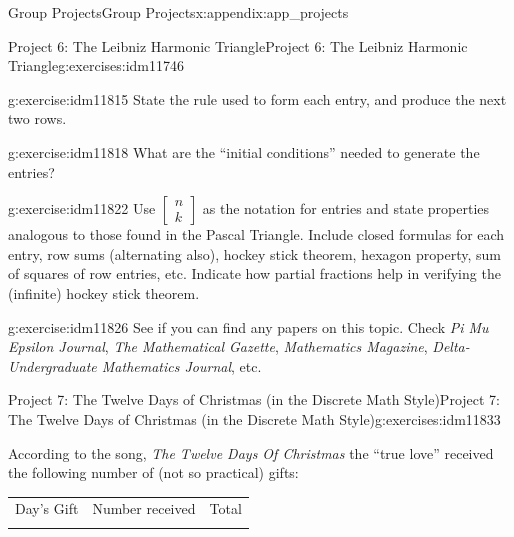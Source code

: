 \documentclass[oneside,10pt,]{book}
\numberwithin{equation}{chapter}
\newcommand{\hrulemedium}{\noalign{\hrule height 0.07em}}
\begin{document}
\begin{appendixptx}{Group Projects}{}{Group Projects}{}{}{x:appendix:app_projects}
\begin{exercises-section-numberless}{Project 6: The Leibniz Harmonic Triangle}{}{Project 6: The Leibniz Harmonic Triangle}{}{}{g:exercises:idm11746}
\begin{sidebyside}{1}{0}{0}{0}
\begin{sbspanel}{1}
{\par}
\end{sbspanel}%
\end{sidebyside}%
\begin{divisionexercise}{1}{}{}{g:exercise:idm11815}%
State the rule used to form each entry, and produce the next two rows.%
\end{divisionexercise}%
\begin{divisionexercise}{2}{}{}{g:exercise:idm11818}%
What are the ``initial conditions'' needed to generate the entries?%
\end{divisionexercise}%
\begin{divisionexercise}{3}{}{}{g:exercise:idm11822}%
Use \(\begin{bmatrix} n\\ k \end{bmatrix}\) as the notation for entries and state properties analogous to those found in the Pascal Triangle. Include closed formulas for each entry, row sums (alternating also), hockey stick theorem, hexagon property, sum of squares of row entries, etc. Indicate how partial fractions help in verifying the (infinite) hockey stick theorem.%
\end{divisionexercise}%
\begin{divisionexercise}{4}{}{}{g:exercise:idm11826}%
See if you can find any papers on this topic. Check \emph{Pi Mu Epsilon Journal}, \emph{The Mathematical Gazette}, \emph{Mathematics Magazine}, \emph{Delta-Undergraduate Mathematics Journal}, etc.%
\end{divisionexercise}%
\end{exercises-section-numberless}
%
%
\typeout{************************************************}
\typeout{************************************************}
%
\begin{exercises-section-numberless}{Project 7: The Twelve Days of Christmas (in the Discrete Math Style)}{}{Project 7: The Twelve Days of Christmas (in the Discrete Math Style)}{}{}{g:exercises:idm11833}
\begin{introduction}{}%
According to the song, \emph{The Twelve Days Of Christmas} the ``true love'' received the following number of (not so practical) gifts:%
\begin{sidebyside}{1}{0.2}{0.2}{0}%
\begin{sbspanel}{0.6}%
{\centering%
\begin{tabular}{lll}
Day's Gift&Number received&Total\tabularnewline\hrulemedium

\end{tabular}}
\end{sbspanel}
\end{sidebyside}
\end{introduction}
\end{exercises-section-numberless}
\end{appendixptx}
\end{document}

